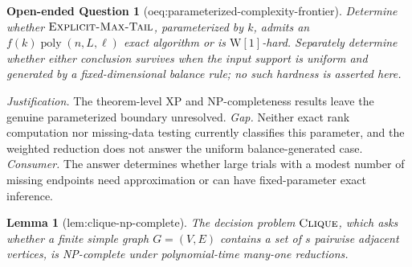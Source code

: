 \documentclass{article}
\newtheorem{lemma}{Lemma}
\newtheorem{openendedquestion}{Open-ended Question}
\begin{document}
\begin{openendedquestion}[oeq:parameterized-complexity-frontier]\label{oeq:parameterized-complexity-frontier}
Determine whether \(\textsc{Explicit-Max-Tail}\), parameterized by \(k\), admits an \(f(k)\operatorname{poly}(n,L,\ell)\) exact algorithm or is \(\mathrm{W}[1]\)-hard. Separately determine whether either conclusion survives when the input support is uniform and generated by a fixed-dimensional balance rule; no such hardness is asserted here.
\end{openendedquestion}
\par\smallskip\noindent \textit{Justification.} The theorem-level XP and NP-completeness results leave the genuine parameterized boundary unresolved. \textit{Gap.} Neither exact rank computation nor missing-data testing currently classifies this parameter, and the weighted reduction does not answer the uniform balance-generated case. \textit{Consumer.} The answer determines whether large trials with a modest number of missing endpoints need approximation or can have fixed-parameter exact inference.

\begin{lemma}[lem:clique-np-complete]\label{lem:clique-np-complete}
The decision problem \(\textsc{Clique}\), which asks whether a finite simple graph \(G=(V,E)\) contains a set of \(s\) pairwise adjacent vertices, is NP-complete under polynomial-time many-one reductions.
\end{lemma}
\end{document}
